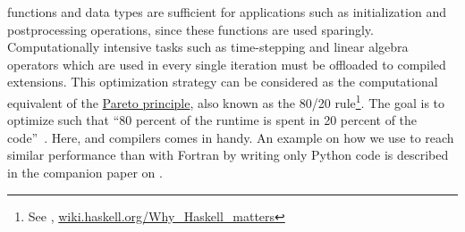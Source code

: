 \Numpy functions and data types are sufficient for applications such as
initialization and postprocessing operations, since these functions are used
sparingly. Computationally intensive tasks such as time-stepping and linear
algebra operators which are used in every single iteration must be offloaded to
compiled extensions.
%
This optimization strategy can be considered as the computational equivalent of
the \href{https://en.wikipedia.org/wiki/Pareto_principle}{Pareto principle}, also
known as the 80/20 rule\footnote{See \citet{behnel_cython2011},
\href{https://wiki.haskell.org/Why_Haskell_matters}{%
wiki.haskell.org/Why\_Haskell\_matters}}.
%
The goal is to optimize such that ``80 percent of the runtime is spent in
20 percent of the code''~\cite[]{meyers2012effective}.
%
Here,  \citep{behnel_cython2011} and 
\citep{guelton2018pythran} compilers comes in handy.
%
An example on how we use  to reach similar performance than with
Fortran by writing only Python code is described in the companion paper on
 \citep{fluidfft}.




